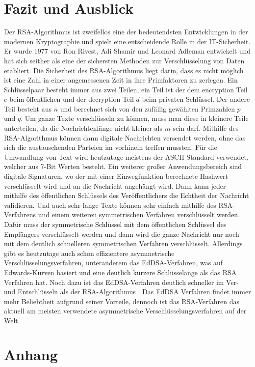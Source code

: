 \documentclass[12pt,a4paper]{scrartcl}
\begin{document}
\section{Fazit und Ausblick}
Der RSA-Algorithmus ist zweifellos eine der bedeutendsten Entwicklungen in der modernen Kryptographie und spielt eine entscheidende Rolle in der IT-Sicherheit. Er wurde 1977 von Ron Rivest, Adi Shamir und Leonard Adleman entwickelt und hat sich seither als eine der sichersten Methoden zur Verschlüsselung von Daten etabliert. Die Sicherheit des RSA-Algorithmus liegt darin, dass es nicht möglich ist eine Zahl in einer angemessenen Zeit in ihre Primfaktoren zu zerlegen. Ein Schlüsselpaar besteht immer aus zwei Teilen, ein Teil ist der dem encryption Teil $e$ beim öffentlichen und der decryption Teil $d$ beim privaten Schlüssel. Der andere Teil besteht aus $n$ und berechnet sich von den zufällig gewählten Primzahlen $p$ und $q$. Um ganze Texte verschlüsseln zu können, muss man diese in kleinere Teile unterteilen, da die Nachrichtenlänge nicht kleiner als $m$ sein darf. Mithilfe des RSA-Algorithmus können dann digitale Nachrichten versendet werden, ohne das sich die austauschenden Parteien im vorhinein treffen mussten. Für die Umwandlung von Text wird heutzutage meistens der ASCII Standard verwendet, welcher aus 7-Bit Werten besteht. Ein weiterer großer Anwendungsbereich sind digitale Signaturen, wo der mit einer Einwegfunktion berechnete Hashwert verschlüsselt wird und an die Nachricht angehängt wird. Dann kann jeder mithilfe des öffentlichen Schlüssels des Veröffentlichers die Echtheit der Nachricht validieren. Und auch sehr lange Texte können sehr einfach mithilfe des RSA-Verfahrens und einem weiteren symmetrischen Verfahren verschlüsselt werden. Dafür muss der symmetrische Schlüssel mit dem öffentlichen Schlüssel des Empfängers verschlüsselt werden und dann wird die ganze Nachricht nur noch mit dem deutlich schnelleren symmetrischen Verfahren verschlüsselt. Allerdings gibt es heutzutage auch schon effizientere asymmetrische Verschlüsselungsverfahren, unteranderem das EdDSA-Verfahren, was auf Edwards-Kurven basiert und eine deutlich kürzere Schlüsselänge als das RSA Verfahren hat. Noch dazu ist das EdDSA-Verfahren deutlich schneller im Ver- und Entschlüsseln als der RSA-Algorithmus \cite{other_keys}. Das EdDSA Verfahren findet immer mehr Beliebtheit aufgrund seiner Vorteile, dennoch ist das RSA-Verfahren das aktuell am meisten verwendete asymmetrische Verschlüsselungsverfahren auf der Welt.


\pagebreak
\section{Anhang}
\end{document}
